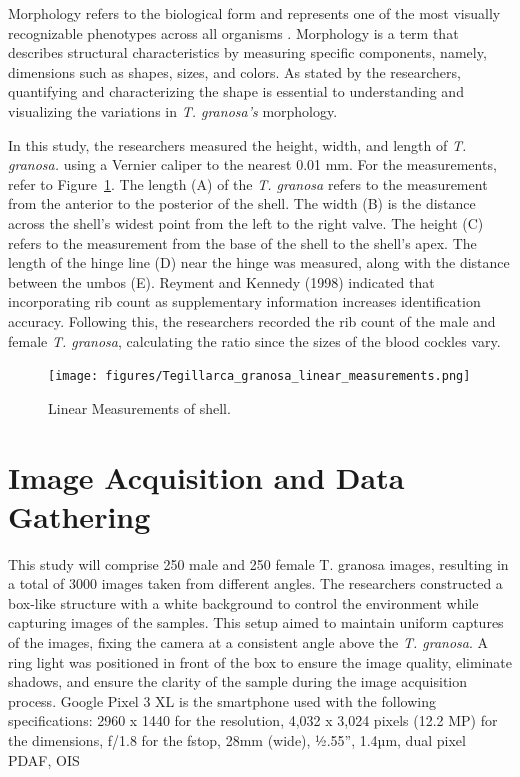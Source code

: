 Morphology refers to the biological form and represents one of the most visually recognizable phenotypes across all organisms \cite{tsutsumi2023}. Morphology is a term that describes structural characteristics by measuring specific components, namely, dimensions such as shapes, sizes, and colors. As stated by the researchers, quantifying and characterizing the shape is essential to understanding and visualizing the variations in \textit{T. granosa’s} morphology. 

In this study, the researchers measured the height, width, and length of \textit{T. granosa.} using a Vernier caliper to the nearest 0.01 mm. For the measurements, refer to Figure~\ref{fig:linear_measurements}. The length (A) of the \textit{T. granosa} refers to the measurement from the anterior to the posterior of the shell. The width (B) is the distance across the shell’s widest point from the left to the right valve. The height (C) refers to the measurement from the base of the shell to the shell’s apex. The length of the hinge line (D) near the hinge was measured, along with the distance between the umbos (E). 
Reyment and Kennedy (1998) indicated that incorporating rib count as supplementary information increases identification accuracy. Following this, the researchers recorded the rib count of the male and female \textit{T. granosa}, calculating the ratio since the sizes of the blood cockles vary. 

\begin{figure}[!htbp]
	\centering
	\texttt{[image: figures/Tegillarca\_granosa\_linear\_measurements.png]}
	\caption{Linear Measurements of  \Tegillarcagranosa shell.}
	\label{fig:linear_measurements}
\end{figure}

\section{Image Acquisition and Data Gathering}
\label{sec:imageprocess}
This study will comprise 250 male and 250 female T. granosa images, resulting in a total of 3000 images taken from different angles. The researchers constructed a box-like structure with a white background to control the environment while capturing images of the samples. This setup aimed to maintain uniform captures of the images, fixing the camera at a consistent angle above the \textit{T. granosa}. A ring light was positioned in front of the box to ensure the image quality, eliminate shadows, and ensure the clarity of the sample during the image acquisition process. Google Pixel 3 XL is the smartphone used with the following specifications: 2960 x 1440 for the resolution, 4,032 x 3,024 pixels (12.2 MP) for the dimensions, f/1.8 for the fstop, 28mm (wide), ½.55”, 1.4µm, dual pixel PDAF, OIS \cite{concepcion2023}

